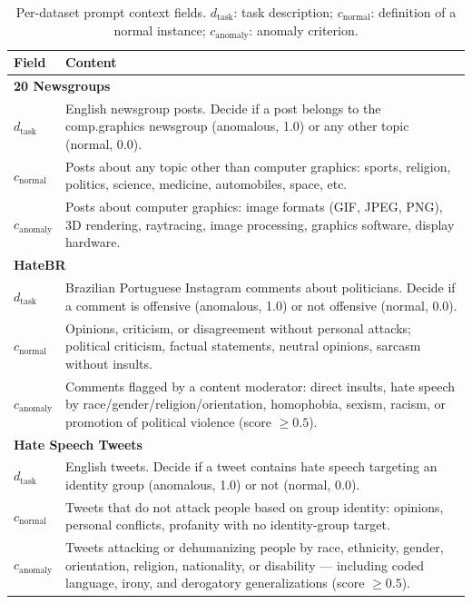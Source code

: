 \documentclass[12pt]{article}
\begin{document}
\renewcommand{\arraystretch}{1.1}
\begin{table}[ht]
\small
\centering
\caption{Per-dataset prompt context fields. $d_{\text{task}}$: task description;
         $c_{\text{normal}}$: definition of a normal instance;
         $c_{\text{anomaly}}$: anomaly criterion.}
\label{tab:prompts}
\begin{tabularx}{\textwidth}{lX}
\toprule
\textbf{Field} & \textbf{Content} \\
\midrule
\multicolumn{2}{l}{\textbf{20 Newsgroups}} \\
$d_{\text{task}}$ & English newsgroup posts. Decide if a post belongs to the comp.graphics newsgroup (anomalous, 1.0) or any other topic (normal, 0.0). \\
$c_{\text{normal}}$ & Posts about any topic other than computer graphics: sports, religion, politics, science, medicine, automobiles, space, etc. \\
$c_{\text{anomaly}}$ & Posts about computer graphics: image formats (GIF, JPEG, PNG), 3D rendering, raytracing, image processing, graphics software, display hardware. \\
\midrule
\multicolumn{2}{l}{\textbf{HateBR}} \\
$d_{\text{task}}$ & Brazilian Portuguese Instagram comments about politicians. Decide if a comment is offensive (anomalous, 1.0) or not offensive (normal, 0.0). \\
$c_{\text{normal}}$ & Opinions, criticism, or disagreement without personal attacks; political criticism, factual statements, neutral opinions, sarcasm without insults. \\
$c_{\text{anomaly}}$ & Comments flagged by a content moderator: direct insults, hate speech by race/gender/religion/orientation, homophobia, sexism, racism, or promotion of political violence (score $\geq 0.5$). \\
\midrule
\multicolumn{2}{l}{\textbf{Hate Speech Tweets}} \\
$d_{\text{task}}$ & English tweets. Decide if a tweet contains hate speech targeting an identity group (anomalous, 1.0) or not (normal, 0.0). \\
$c_{\text{normal}}$ & Tweets that do not attack people based on group identity: opinions, personal conflicts, profanity with no identity-group target. \\
$c_{\text{anomaly}}$ & Tweets attacking or dehumanizing people by race, ethnicity, gender, orientation, religion, nationality, or disability --- including coded language, irony, and derogatory generalizations (score $\geq 0.5$). \\

\end{tabularx}
\end{table}
\end{document}

